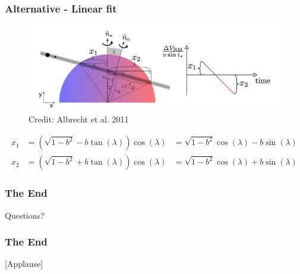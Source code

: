 \documentclass[show notes]{beamer}
\begin{document}
\begin{frame}
\frametitle{Alternative - Linear fit}
	\begin{figure}
		\centering
		\includegraphics[width=\textwidth]{../figures/RM_albrecht.png}
		\caption{Credit: Albrecht et al. 2011}
		\label{fig:RM_albrecht}
	\end{figure}

\begin{align*}
	x_1 &= \left(\sqrt{1-b^2}-b\tan(\lambda)\right)\cos(\lambda) &= \sqrt{1-b^2}\cos(\lambda) -b \sin(\lambda)\\
	x_2 &= \left(\sqrt{1-b^2}+b\tan(\lambda)\right)\cos(\lambda) &= \sqrt{1-b^2}\cos(\lambda)+ b\sin(\lambda)
\end{align*}
\end{frame}


\begin{frame}
\frametitle{The End}
Questions?
\end{frame}

\begin{frame}
\frametitle{The End}

[Applause]
\end{frame}
\end{document}
